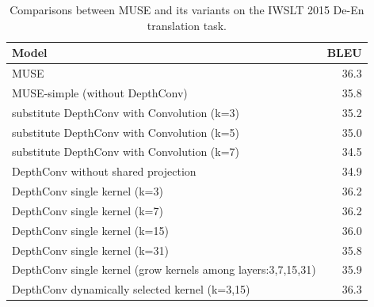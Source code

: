 \documentclass{article} %
\begin{document}



\begin{table}[t]
\centering
\begin{tabular}{lr}
\toprule
Model & BLEU \\
\midrule
MUSE & 36.3\\
MUSE-simple (without DepthConv) & 35.8 \\ \midrule
substitute DepthConv with Convolution (k=3) & 35.2 \\  
substitute DepthConv with Convolution (k=5) & 35.0 \\  
substitute DepthConv with Convolution (k=7) & 34.5 \\  \midrule
DepthConv without shared projection &34.9 \\
DepthConv single kernel (k=3) & 36.2 \\  
DepthConv single kernel (k=7) & 36.2 \\ 
DepthConv single kernel (k=15) & 36.0 \\  
DepthConv single kernel (k=31) & 35.8 \\
DepthConv single kernel (grow kernels among layers:3,7,15,31) & 35.9 \\
DepthConv dynamically selected kernel (k=3,15) & 36.3 \\
\bottomrule
\end{tabular}
\caption{Comparisons between  MUSE and its variants on the IWSLT 2015 De-En translation task.}
\label{tab:ablaton}
\end{table}
\end{document}
